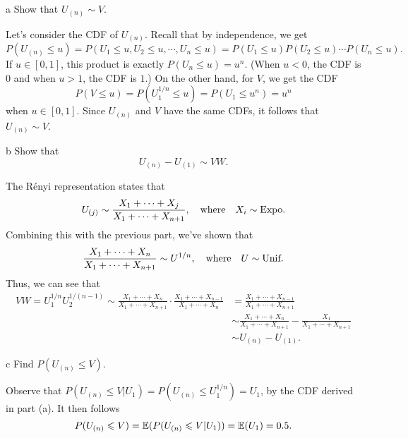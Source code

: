 \documentclass{pset}
\begin{document}
\begin{parts}
\begin{part}{a}
  Show that $U_{(n)} \sim V.$
\end{part}

Let's consider the CDF of $U_{(n)}$. Recall that by independence, we get
\[
    P(U_{(n)} \leq u) = P(U_1 \leq u, U_2 \leq u, \cdots, U_n \leq u) = P(U_1\leq u)P(U_2\leq u) \cdots P(U_n\leq u).
\]
If $u\in [0,1]$, this product is exactly $P(U_{n}\leq u) = u^n$. (When $u<0$, the CDF is $0$ and when $u > 1$, the CDF is $1$.) On the other hand, for $V$, we get the CDF
\[
    P(V \leq u) = P(U_1^{1/n} \leq u) = P(U_1 \leq u^n) = u^n
\]
when $u\in [0,1]$. Since $U_{(n)}$ and $V$ have the same CDFs, it follows that $U_{(n)}\sim V$.

\begin{part}{b}
Show that $$U_{(n)} - U_{(1)} \sim VW.$$
\end{part}

The R\'enyi representation states that
\[
    U_{(j)} \sim \frac{X_1+\cdots+X_j}{X_1+\cdots +X_{n+1}},\quad\textrm{where}\quad X_i\sim \textrm{Expo}.
\]
Combining this with the previous part, we've shown that
\[
  \frac{X_1+\cdots+X_n}{X_1+\cdots+X_{n+1}} \sim U^{1/n},\quad \textrm{where}\quad U\sim \textrm{Unif}.
\]
Thus, we can see that
\[
  \begin{aligned}
    VW = U_1^{1/n} U_2^{1/(n-1)} \sim \frac{X_1+\cdots +X_n}{X_1+\cdots+X_{n+1}}\cdot \frac{X_1+\cdots + X_{n-1}}{X_1+\cdots+X_n} &= \frac{X_1+\cdots+X_{n-1}}{X_1+\cdots+X_{n+1}}\\ &\sim\frac{X_1+\cdots+X_n}{X_1+\cdots+X_{n+1}}-\frac{X_1}{X_1+\cdots + X_{n+1}}\\ &\sim U_{(n)} - U_{(1)}.
  \end{aligned}
\]

\begin{part}{c} 
Find $P(U_{(n)} \leq V).$
\end{part}

Observe that $P(U_{(n)} \leq V | U_1) = P(U_{(n)} \leq U_1^{1/n}) = U_1$, by the CDF derived in part (a). It then follows \[P(U_{(n)} \leqslant V) = \mathbb{E}(P(U_{(n)} \leqslant V | U_1))=\mathbb{E}(U_1)=0.5.\]
\end{parts}
\end{document}
